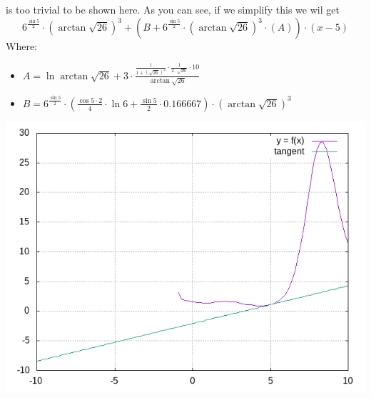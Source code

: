 \documentclass{article}
\begin{document}
is too trivial to be shown here.
As you can see, if we simplify this we wil get
\begin{equation}
6 ^{\frac{\sin 5 }{2 } } \cdot \left( \arctan \sqrt {26 } \right) ^{3 } + \left( B + 6 ^{\frac{\sin 5 }{2 } } \cdot \left( \arctan \sqrt {26 } \right) ^{3 } \cdot \left( A \right) \right) \cdot \left( x - 5 \right) 
\end{equation}
Where:
\begin{itemize}
	\item $A = \ln \arctan \sqrt {26 } + 3 \cdot \frac{\frac{1 }{1 + \left( \sqrt {26 } \right) ^{2 } } \cdot \frac{1 }{2 \cdot \sqrt {26 } } \cdot 10 }{\arctan \sqrt {26 } } $
	\item $B = 6 ^{\frac{\sin 5 }{2 } } \cdot \left( \frac{\cos 5 \cdot 2 }{4 } \cdot \ln 6 + \frac{\sin 5 }{2 } \cdot 0.166667 \right) \cdot \left( \arctan \sqrt {26 } \right) ^{3 } $
\end{itemize}

\includegraphics{"plot.png"}
\end{document}
